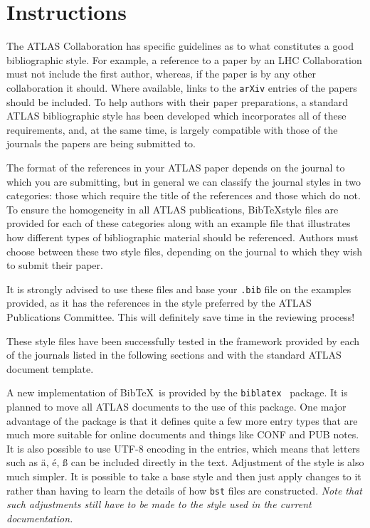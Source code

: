 \documentclass[UKenglish]{latex/atlasdoc}
\author{Ian C. Brock}
\affil{University of Bonn}
\newcommand*{\BibTeX}{Bib\TeX}
\newcommand{\File}[1]{\texttt{#1}\xspace}
\begin{document}
 


\section{Instructions}

The ATLAS Collaboration has specific guidelines as to what constitutes a good bibliographic style. 
For example, a reference to a paper by an LHC Collaboration must not include the first author,
whereas, if the paper is by any other collaboration it should. 
Where available, links to the \texttt{arXiv} entries of the papers should be included. 
To help authors with their paper preparations,
a standard ATLAS bibliographic style has been developed which incorporates all of these requirements, 
and, at the same time, is largely compatible with those of the journals the papers are being submitted to. 

The format of the references in your ATLAS paper depends on the journal to which you are submitting,
but in general we can classify the journal styles in two categories: 
those which require the title of the references and those which do not. 
To ensure the homogeneity in all ATLAS publications, 
\BibTeX style files are provided for each of these categories along with an example file that illustrates how different types of bibliographic material should be referenced.
Authors must choose between these two style files, depending on the journal to which they wish to submit their paper.

It is strongly advised to use these files and base your \File{.bib} file on the examples provided,
as it has the references in the style preferred by the ATLAS Publications Committee.
This will definitely save time in the reviewing process!

These style files have been successfully tested in the framework provided by each of the journals listed in the following sections and with the standard ATLAS document template.

A new implementation of \BibTeX\ is provided by the \texttt{biblatex}~\cite{biblatex} package.
It is planned to move all ATLAS documents to the use of this package.
One major advantage of the package is that it defines quite a few more entry types
that are much more suitable for online documents and things like CONF and PUB notes.
It is also possible to use UTF-8 encoding in the entries, which means that letters such as
ä, é, ß can be included directly in the text.
Adjustment of the style is also much simpler.
It is possible to take a base style and then just apply changes to it rather than
having to learn the details of how \texttt{bst} files are constructed.
\emph{Note that such adjustments still have to be made to the style used in the current documentation.}
\end{document}
